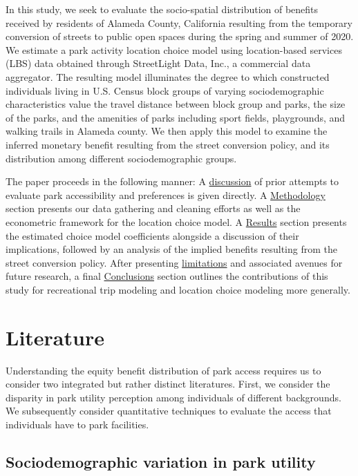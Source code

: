\documentclass[3p, authoryear, review]{elsarticle} %
\begin{document}
In this study, we seek to evaluate the socio-spatial distribution of benefits
received by residents of Alameda County, California resulting from the
temporary conversion of streets to public open spaces during the spring and summer
of 2020. We estimate a park activity location choice model using location-based
services (LBS) data obtained through StreetLight Data, Inc., a commercial data
aggregator. The resulting model illuminates the degree to which constructed
individuals living in U.S. Census block groups of varying sociodemographic
characteristics value the travel distance between block group and parks, the
size of the parks, and the amenities of parks including sport fields,
playgrounds, and walking trails in Alameda county. We then apply this model to
examine the inferred monetary benefit resulting from the street conversion
policy, and its distribution among different sociodemographic groups.

The paper proceeds in the following manner: A \protect\hyperlink{literature}{discussion} of prior attempts to
evaluate park accessibility and preferences is given directly. A \protect\hyperlink{methodology}{Methodology}
section presents our data gathering and cleaning efforts as well as the
econometric framework for the location choice model. A \protect\hyperlink{results}{Results} section
presents the estimated choice model coefficients alongside a discussion of their
implications, followed by an analysis of the implied benefits resulting from the
street conversion policy. After presenting \protect\hyperlink{limitations}{limitations} and associated avenues
for future research, a final \protect\hyperlink{conclusions}{Conclusions} section outlines the contributions of
this study for recreational trip modeling and location choice modeling more
generally.

\hypertarget{literature}{%
\section{Literature}\label{literature}}

Understanding the equity benefit distribution of park access
requires us to consider two integrated but rather distinct literatures.
First, we consider the disparity in park utility perception among individuals of
different backgrounds. We subsequently consider quantitative techniques to
evaluate the access that individuals have to park facilities.

\hypertarget{sociodemographic-variation-in-park-utility}{%
\subsection{Sociodemographic variation in park utility}\label{sociodemographic-variation-in-park-utility}}
\end{document}

